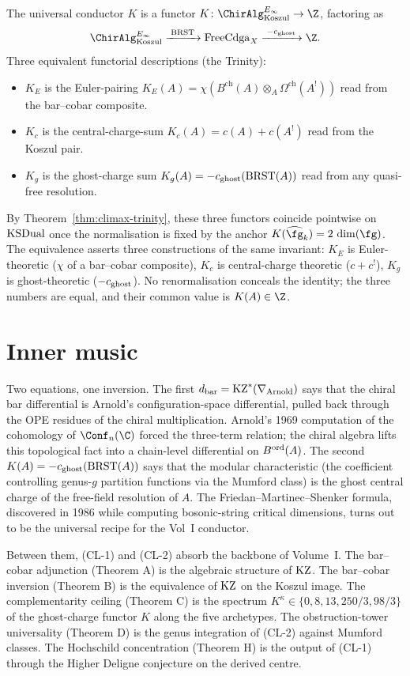 The universal conductor \(K\) is a functor
\(K\colon \ChirAlgInf_{\mathrm{Koszul}} \to \Z\), factoring as
\[
  \ChirAlgInf_{\mathrm{Koszul}}
  \xrightarrow{\;\BRST\;}
  \mathrm{FreeCdga}_{X}
  \xrightarrow{\;-\cghost\;}
  \Z.
\]
Three equivalent functorial descriptions (the Trinity):
\begin{itemize}
\item \(K_{E}\) is the Euler-pairing
\(K_{E}(A) = \chi(B^{\mathrm{ch}}(A) \otimes_{A} \Omega^{\mathrm{ch}}(A^{!}))\)
read from the bar--cobar composite.
\item \(K_{c}\) is the central-charge-sum
\(K_{c}(A) = c(A) + c(A^{!})\) read from the Koszul pair.
\item \(K_{g}\) is the ghost-charge sum
\(K_{g}(A) = -c_{\mathrm{ghost}}(\mathrm{BRST}(A))\) read from any quasi-free resolution.
\end{itemize}
By Theorem~\ref{thm:climax-trinity}, these three functors coincide
pointwise on \(\mathrm{KSDual}\) once the normalisation is fixed by the anchor
\(K(\widehat{\fg}_{k}) = 2\,\dim(\fg)\). The equivalence asserts three
constructions of the same invariant: \(K_{E}\) is Euler-theoretic
(\(\chi\) of a bar--cobar composite), \(K_{c}\) is central-charge
theoretic (\(c + c^{!}\)), \(K_{g}\) is ghost-theoretic
(\(-c_{\mathrm{ghost}}\)). No renormalisation conceals the identity; the three
numbers are equal, and their common value is \(K(A) \in \Z\).

\section{Inner music}
\label{sec:climax-inner-music}

Two equations, one inversion. The first \(d_{\mathrm{bar}} = \mathrm{KZ}^{*}(\nabla_{\mathrm{Arnold}})\) says
that the chiral bar differential is Arnold's configuration-space
differential, pulled back through the OPE residues of the chiral
multiplication. Arnold's 1969 computation of the cohomology of
\(\Conf_{n}(\C)\) forced the three-term relation; the chiral algebra
lifts this topological fact into a chain-level differential on
\(B^{\mathrm{ord}}(A)\). The second \(K(A) = -c_{\mathrm{ghost}}(\mathrm{BRST}(A))\) says that the
modular characteristic \textup{(}the coefficient controlling genus-\(g\)
partition functions via the Mumford class\textup{)} is the ghost
central charge of the free-field resolution of \(A\). The
Friedan--Martinec--Shenker formula, discovered in 1986 while computing
bosonic-string critical dimensions, turns out to be the universal
recipe for the Vol~I conductor.

Between them, \textup{(CL-1)} and \textup{(CL-2)} absorb the backbone
of Volume~I. The bar--cobar adjunction \textup{(Theorem A)} is the
algebraic structure of \(\mathrm{KZ}\). The bar--cobar inversion
\textup{(Theorem B)} is the equivalence of \(\mathrm{KZ}\) on the Koszul image.
The complementarity ceiling \textup{(Theorem C)} is the spectrum
\(K^{\kappa} \in \{0, 8, 13, 250/3, 98/3\}\) of the ghost-charge
functor \(K\) along the five archetypes.  The obstruction-tower
universality \textup{(Theorem D)} is the genus integration of
\textup{(CL-2)} against Mumford classes. The Hochschild concentration
\textup{(Theorem H)} is the output of \textup{(CL-1)} through the Higher
Deligne conjecture on the derived centre.

